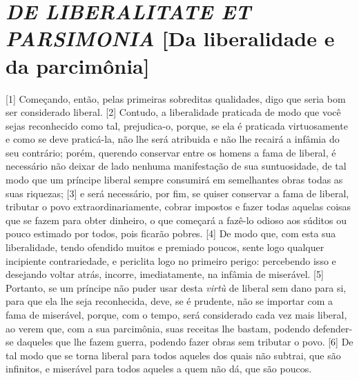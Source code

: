 \quebra\section{\emph{DE LIBERALITATE ET PARSIMONIA}\break
{[}Da liberalidade e da parcimônia{]}}

{[}1{]} Começando, então, pelas primeiras sobreditas qualidades, digo
que seria bom ser considerado liberal. {[}2{]} Contudo, a liberalidade
praticada de modo que você sejas reconhecido como tal, prejudica-o,
porque, se ela é praticada virtuosamente e como se deve praticá-la, não
lhe será atribuida e não lhe recairá a infâmia do seu contrário; porém,
querendo conservar entre os homens a fama de liberal, é necessário não
deixar de lado nenhuma manifestação de sua suntuosidade, de tal modo que
um príncipe liberal sempre consumirá em semelhantes obras todas as suas
riquezas; {[}3{]} e será necessário, por fim, se quiser conservar a fama
de liberal, tributar o povo extraordinariamente, cobrar impostos e fazer
todas aquelas coisas que se fazem para obter dinheiro, o que começará a
fazê-lo odioso aos súditos ou pouco estimado por todos, pois ficarão
pobres. {[}4{]} De modo que, com esta sua liberalidade, tendo ofendido
muitos e premiado poucos, sente logo qualquer incipiente contrariedade,
e periclita logo no primeiro perigo: percebendo isso e desejando voltar
atrás, incorre, imediatamente, na infâmia de miserável. {[}5{]}
Portanto, se um príncipe não puder usar desta \emph{virtù} de liberal
sem dano para si, para que ela lhe seja reconhecida, deve, se é
prudente, não se importar com a fama de miserável, porque, com o tempo,
será considerado cada vez mais liberal, ao verem que, com a sua
parcimônia, suas receitas lhe bastam, podendo defender-se daqueles que
lhe fazem guerra, podendo fazer obras sem tributar o povo. {[}6{]} De
tal modo que se torna liberal para todos aqueles dos quais não subtrai,
que são infinitos, e miserável para todos aqueles a quem não dá, que são
poucos.

